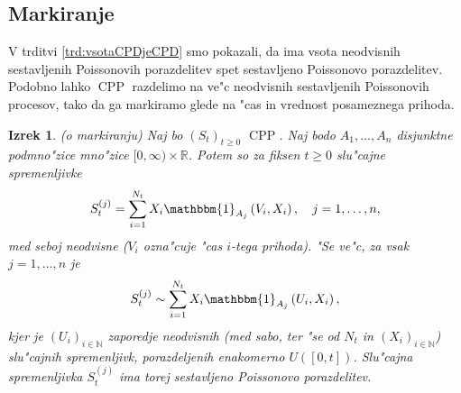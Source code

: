 \documentclass[12pt, a4paper, reqno]{amsart}
\theoremstyle{definition}
\theoremstyle{plain}
\newtheorem{izrek}[definicija]{Izrek}
\newcommand{\R}{\mathbb{R}}
\newcommand{\N}{\mathbb{N}}
\newcommand{\1}{\mathds{1}}
\DeclareMathOperator{\CPP}{CPP}
\begin{document}
%
%
%
%            

    \subsection{Markiranje}
        V trditvi \ref{trd:vsotaCPDjeCPD} smo pokazali, da ima vsota neodvisnih sestavljenih Poissonovih porazdelitev 
        spet sestavljeno Poissonovo porazdelitev. Podobno lahko $\CPP$ razdelimo na ve"c neodvisnih
        sestavljenih Poissonovih procesov, tako da ga markiramo glede na "cas in vrednost posameznega 
        prihoda. 
 
        \begin{izrek}(o markiranju)
            Naj bo $(S_t)_{t\geq0}$ $\CPP$. Naj bodo $A_1, \dots, A_n$ disjunktne podmno"zice mno"zice 
            $[0, \infty) \times \R$. Potem so za fiksen $t\geq0$ slu"cajne spremenljivke
            \begin{equation}
                S_t^{(j)} = \sum_{i=1}^{N_t}X_i\mathbbm{1}_{A_j}\left(V_i, X_i\right), \quad j = 1, \dots, n,
                \label{eq:markedCPP}
            \end{equation}
            med seboj neodvisne ($V_i$ ozna"cuje "cas $i$-tega prihoda). "Se ve"c, za vsak $j = 1, \dots, n$ je
            \begin{equation*}
                S_t^{(j)} \sim \sum_{i=1}^{N_t}X_i\mathbbm{1}_{A_j}\left(U_i, X_i\right),
            \end{equation*}
            kjer je $(U_i)_{i\in\N}$ zaporedje neodvisnih (med sabo, ter "se od $N_t$ in $(X_i)_{i\in\N}$) 
            slu"cajnih spremenljivk, porazdeljenih enakomerno $U\left([0, t]\right)$. Slu"cajna spremenljivka 
            $S_t^{(j)}$ ima torej sestavljeno Poissonovo porazdelitev.
            \label{izr:MarkiranjeCPP}
        \end{izrek}
\end{document}
